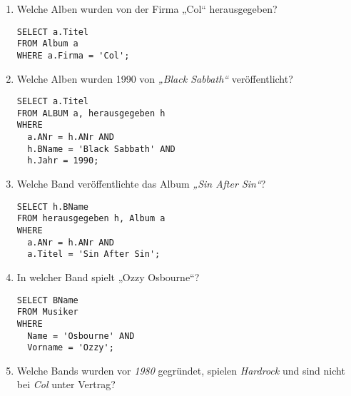 \documentclass{lehramt-informatik-haupt}
\begin{document}
\renewcommand{\labelenumi}{(\alph{enumi})}
\begin{enumerate}


\item Welche Alben wurden von der Firma „Col“ herausgegeben?

\begin{antwort}[muster]
\begin{verbatim}
SELECT a.Titel
FROM Album a
WHERE a.Firma = 'Col';
\end{verbatim}
\end{antwort}


\item Welche Alben wurden 1990 von \emph{„Black Sabbath“}
veröffentlicht?

\begin{antwort}[muster]
\begin{verbatim}
SELECT a.Titel
FROM ALBUM a, herausgegeben h
WHERE
  a.ANr = h.ANr AND
  h.BName = 'Black Sabbath' AND
  h.Jahr = 1990;
\end{verbatim}
\end{antwort}


\item Welche Band veröffentlichte das Album \emph{„Sin After Sin“}?

\begin{antwort}[muster]
\begin{verbatim}
SELECT h.BName
FROM herausgegeben h, Album a
WHERE
  a.ANr = h.ANr AND
  a.Titel = 'Sin After Sin';
\end{verbatim}
\end{antwort}


\item In welcher Band spielt „Ozzy Osbourne“?

\begin{antwort}[muster]
\begin{verbatim}
SELECT BName
FROM Musiker
WHERE
  Name = 'Osbourne' AND
  Vorname = 'Ozzy';
\end{verbatim}
\end{antwort}


\item Welche Bands wurden vor \emph{1980} gegründet, spielen
\emph{Hardrock} und sind nicht bei \emph{Col} unter Vertrag?


\end{enumerate}
\end{document}
